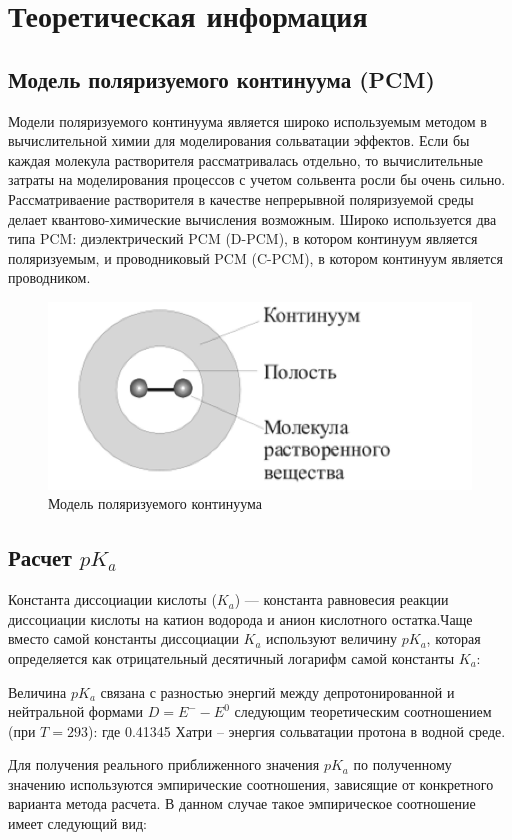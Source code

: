 \section{Теоретическая информация}
\subsection{Модель поляризуемого континуума (PCM)}
Модели поляризуемого континуума является широко используемым методом в вычислительной химии для моделирования сольватации эффектов. Если бы каждая молекула растворителя рассматривалась отдельно, то вычислительные затраты на моделирования процессов с учетом сольвента росли бы очень сильно. Рассматриваение растворителя в качестве непрерывной поляризуемой среды делает квантово-химические вычисления возможным. Широко используется два типа PCM: диэлектрический PCM (D-PCM), в котором континуум является поляризуемым, и проводниковый PCM (C-PCM), в котором континуум является проводником. 

\begin{figure}[H]
\centering
\captionsetup{justification=centering}
\includegraphics[scale=1.0]{fig/1.jpg}
\caption{Модель поляризуемого континуума}
\end{figure}


\subsection{Расчет $pK_a$}
Константа диссоциации кислоты ($K_a$) — константа равновесия реакции диссоциации кислоты на катион водорода и анион кислотного остатка.Чаще вместо самой константы диссоциации $K_a$ используют величину $pK_a$, которая определяется как отрицательный десятичный логарифм самой константы $K_a$:

Величина $pK_a$ связана с разностью энергий между депротонированной и нейтральной формами $D = E^{-} - E^{0}$ следующим теоретическим соотношением (при $T = 293$):
где 0.41345 Хатри – энергия сольватации протона в водной среде. 

Для получения реального приближенного значения $pK_a$ по полученному значению   используются эмпирические соотношения, зависящие от конкретного варианта метода расчета. В данном случае такое эмпирическое соотношение имеет следующий вид:
 	
